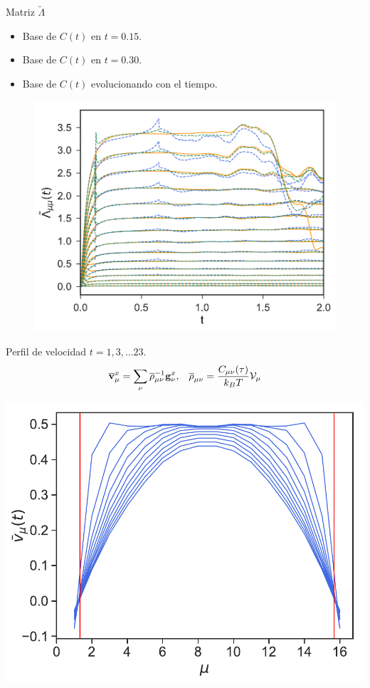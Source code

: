 \documentclass{beamer}
\begin{document}
\begin{frame}{Matriz $\tilde{\Lambda}$}
  \begin{itemize}
    \item {\color{blue} Base de $C(t)$ en $t=0.15$.}
    \item {\color{green} Base de $C(t)$ en $t=0.30$.}
    \item {\color{orange} Base de $C(t)$ evolucionando con el tiempo.}
  \end{itemize}
  \begin{figure}
    \includegraphics[width=0.7\linewidth]{LambdatBasis-WALLS-66nodes}
  \end{figure}
\end{frame}

\begin{frame}{Perfil de velocidad}
  $t=1,3,...23$.
\begin{align}
  \overline{\bf v}^x_\mu=\sum_{\nu}\overline{\rho}_{\mu\nu}^{-1}{\bf g}^x_\nu, &&
  \overline{\rho}_{\mu\nu}=\frac{C_{\mu\nu}(\tau)}{k_BT}  {\cal V}_\mu
  \nonumber
\end{align}

  \begin{center}
  \includegraphics[width=0.7\linewidth]{vtCorrected-17nodes-WALLS-defense}
  \end{center}
\end{frame}
\end{document}
